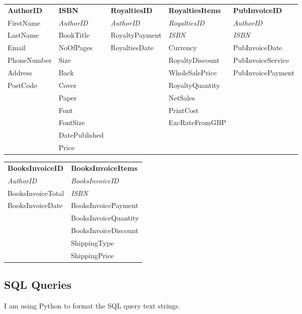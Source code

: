 \begin{tabular}{|p{2.5cm}|p{2.5cm}|p{2.5cm}|p{3cm}|p{3cm}|}
    \hline
    \textbf{AuthorID} & \textbf{ISBN} & \textbf{RoyaltiesID} & \textbf{RoyaltiesItems} & \textbf{PubInvoiceID} \\
    FirstName & \emph{AuthorID} & \emph{AuthorID} & \emph{RoyaltiesID} & \emph{AuthorID} \\
    LastName & BookTitle & RoyaltyPayment & \emph{ISBN} & \emph{ISBN} \\
    Email & NoOfPages & RoyaltiesDate & Currency & PubInvoiceDate \\
    PhoneNumber & Size & & RoyaltyDiscount & PubInvoiceService \\
    Address & Back & & WholeSalePrice & PubInvoicePayment\\
    PostCode & Cover & & RoyaltyQuantity &  \\
    & Paper & & NetSales & \\
    & Font & & PrintCost & \\
    & FontSize & & ExcRateFromGBP & \\
    & DatePublished & & & \\
    & Price & & & \\
    \hline
\end{tabular}

\begin{tabular}{|p{3.5cm}|p{3.5cm}|}
    \hline
    \textbf{BooksInvoiceID} & \textbf{BooksInvoiceItems} \\
    \emph{AuthorID} & \emph{BooksInvoiceID} \\
    BooksInvoiceTotal & \emph{ISBN} \\
    BooksInvoiceDate& BooksInvoicePayment \\
    & BooksInvoiceQuantity \\
    & BooksInvoiceDiscount \\
    & ShippingType \\
    & ShippingPrice \\
    \hline
\end{tabular}

\subsection{SQL Queries}

I am using Python to format the SQL query text strings.

